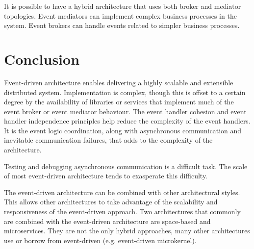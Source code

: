 It is possible to have a hybrid architecture that uses both broker and mediator topologies.
Event mediators can implement complex business processes in the system.
Event brokers can handle events related to simpler business processes.


\section{Conclusion}

Event-driven architecture enables delivering a highly scalable and extensible distributed system.
Implementation is complex,
though this is offset to a certain degree by the availability of libraries or services that implement much of the event broker or event mediator behaviour.
The event handler cohesion and event handler independence principles help reduce the complexity of the event handlers.
It is the event logic coordination, along with asynchronous communication and inevitable communication failures,
that adds to the complexity of the architecture.

Testing and debugging asynchronous communication is a difficult task.
The scale of most event-driven architecture tends to exasperate this difficulty.

The event-driven architecture can be combined with other architectural styles.
This allows other architectures to take advantage of the scalability and responsiveness of the event-driven approach.
Two architectures that commonly are combined with the event-driven architecture are space-based and microservices.
They are not the only hybrid approaches, many other architectures use or borrow from event-driven (e.g. event-driven microkernel).
